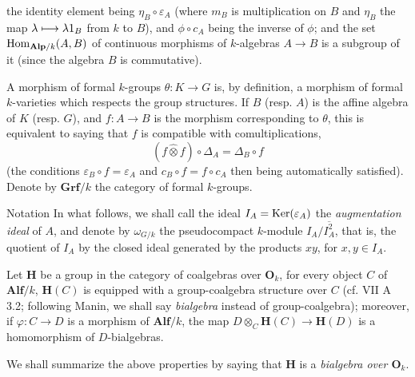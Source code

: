 the identity element being $\eta_B\circ\varepsilon_A$ (where $m_B$ is multiplication on $B$ and $\eta_B$ the map $\lambda\longmapsto\lambda1_B$ from $k$ to $B$), and $\phi\circ c_A$ being the inverse of $\phi$; and the set $\operatorname{Hom}_{\mathbf{Alp}/k}(A,B)$ of continuous morphisms of $k$-algebras $A\to B$ is a subgroup of it (since the algebra $B$ is commutative).
\begin{definition}{}
A morphism of formal $k$-groups $\theta:K\to G$ is, by definition, a morphism of formal $k$-varieties which respects the group structures. If $B$ (resp. $A$) is the affine algebra of $K$ (resp. $G$), and $f:A\to B$ is the morphism corresponding to $\theta$, this is equivalent to saying that $f$ is compatible with comultiplications, \ie
\[
(f\widehat\otimes f)\circ\Delta_A=\Delta_B\circ f
\]
(the conditions $\varepsilon_B\circ f=\varepsilon_A$ and $c_B\circ f=f\circ c_A$ then being automatically satisfied). Denote by $\mathbf{Grf}/k$ the category of formal $k$-groups.
\end{definition}
\begin{enoncerm}{Notation}{}
In what follows, we shall call the ideal $I_A=\operatorname{Ker}(\varepsilon_A)$ the \emph{augmentation ideal} of $A$, and denote by $\omega_{G/k}$ the pseudocompact $k$-module $I_A/\overline{I_A^2}$, that is, the quotient of $I_A$ by the closed ideal generated by the products $xy$, for $x,y\in I_A$.
\end{enoncerm}

Let $\mathbf H$ be a group in the category of coalgebras over $\mathbf O_k$, \ie for every object $C$ of $\mathbf{Alf}/k$, $\mathbf H(C)$ is equipped with a group-coalgebra structure over $C$ (cf. VII A 3.2; following Manin, we shall say \emph{bialgebra} instead of group-coalgebra); moreover, if $\varphi:C\to D$ is a morphism of $\mathbf{Alf}/k$, the map $D\otimes_C\mathbf H(C)\to\mathbf H(D)$ is a homomorphism of $D$-bialgebras.
\begin{definition}{}
We shall summarize the above properties by saying that $\mathbf H$ is a \emph{bialgebra over $\mathbf O_k$}.
\end{definition}

